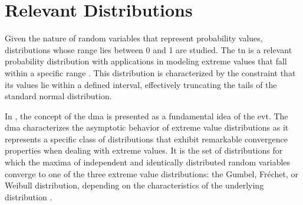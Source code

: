\section{Relevant Distributions}

Given the nature of random variables that represent probability values, distributions whose range lies between 0 and 1 are studied. The \gls{tn} is a relevant probability distribution with applications in modeling extreme values that fall within a specific range \cite{burkardt2014truncated}. This distribution is characterized by the constraint that its values lie within a defined interval, effectively truncating the tails of the standard normal distribution.

In \cite{david2004order}, the concept of the \gls{dma} is presented as a fundamental idea of the \gls{evt}. The \gls{dma} characterizes the asymptotic behavior of extreme value distributions as it represents a specific class of distributions that exhibit remarkable convergence properties when dealing with extreme values. It is the set of distributions for which the maxima of independent and identically distributed random variables converge to one of the three extreme value distributions: the Gumbel, Fréchet, or Weibull distribution, depending on the characteristics of the underlying distribution \cite{gorgoso2014use}.